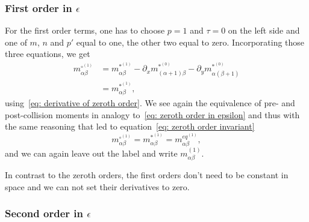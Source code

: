 \subsubsection{First order in \texorpdfstring{$\epsilon$}{epsilon}}
\label{subs: First order in epsilon}

For the first order terms, one has to choose $p=1$ and $\tau=0$ on the left side and one of $m$, $n$ and $p'$ equal to one, the other two equal to zero.
Incorporating those three equations, we get
\begin{equation}
  \label{eq: first order in epsilon}
  \begin{aligned}
  m_{\alpha\beta}^{\circ^{(1)}}
  & = m_{\alpha\beta}^{*^{(1)}}
  - \partial_x m_{(\alpha+1)\beta}^{*^{(0)}} - \partial_y m_{\alpha(\beta+1)}^{*^{(0)}} \\
  & = m_{\alpha\beta}^{*^{(1)}},
  \end{aligned}
\end{equation}
using~\eqref{eq: derivative of zeroth order}.
We see again the equivalence of pre- and post-collision moments in analogy to~\eqref{eq: zeroth order in epsilon} and thus with the same reasoning that led to equation~\eqref{eq: zeroth order invariant}
\begin{equation}
  \label{eq: first order invariant}
  m_{\alpha\beta}^{\circ^{(1)}} = m_{\alpha\beta}^{*^{(1)}} = m_{\alpha\beta}^{eq^{(1)}},
\end{equation}
and we can again leave out the label and write $m_{\alpha\beta}^{(1)}$.

In contrast to the zeroth orders, the first orders don't need to be constant in space and we can not set their derivatives to zero.

\subsubsection{Second order in \texorpdfstring{$\epsilon$}{epsilon}}
\label{subs: Second order in epsilon}

